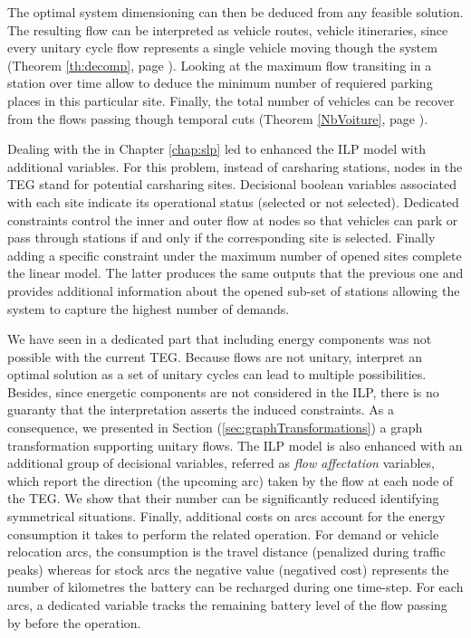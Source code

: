 The optimal system dimensioning can then be deduced from any feasible solution.
The resulting flow can be interpreted as vehicle routes, \ie vehicle itineraries, since every unitary cycle flow represents a single vehicle moving though the system (\see Theorem \ref{th:decomp}, page \pageref{th:decomp}).
Looking at the maximum flow transiting in a station over time allow to deduce the minimum number of requiered parking places in this particular site.
Finally, the total number of vehicles can be recover from the flows passing though temporal cuts (\see Theorem \ref{NbVoiture}, page \pageref{NbVoiture}).

\medskip
Dealing with the {\SLP} in Chapter \ref{chap:slp} led to enhanced the ILP model with additional variables.
For this problem, instead of carsharing stations, nodes in the TEG stand for potential carsharing sites.
Decisional boolean variables associated with each site indicate its operational status (selected or not selected).
Dedicated constraints control the inner and outer flow at nodes so that vehicles can park or pass through stations if and only if the corresponding site is selected.
Finally adding a specific constraint under the maximum number of opened sites complete the linear model. 
The latter produces the same outputs that the previous one and  provides additional information about the opened sub-set of stations allowing the system to capture the highest number of demands.

\medskip
We have seen in a dedicated part that including energy components was not possible with the current TEG.
Because flows are not unitary, interpret an optimal solution as a set of unitary cycles can lead to multiple possibilities.
Besides, since energetic components are not considered in the ILP, there is no guaranty that the interpretation asserts the induced constraints.
As a consequence, we presented in Section (\ref{sec:graphTransformations}) a graph transformation supporting unitary flows.
The ILP model is also enhanced with an additional group of decisional variables, referred as \emph{flow affectation} variables, which report the direction (\ie the upcoming arc) taken by the flow at each node of the TEG.
We show that their number can be significantly reduced identifying symmetrical situations.
Finally, additional costs on arcs account for the energy consumption it takes to perform the related operation.
For demand or vehicle relocation arcs, the consumption is the travel distance (penalized during traffic peaks) whereas for stock arcs the negative value (negatived cost) represents the number of kilometres the battery can be recharged during one time-step.
For each arcs, a dedicated variable tracks the remaining battery level of the flow passing by before the operation.


